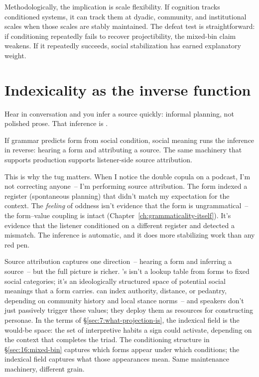 Methodologically, the implication is scale flexibility. If cognition tracks conditioned systems, it can track them at dyadic, community, and institutional scales when those scales are stably maintained. The defeat test is straightforward: if conditioning repeatedly fails to recover projectibility, the mixed-bin claim weakens. If it repeatedly succeeds, social stabilization has earned explanatory weight.

\section{Indexicality as the inverse function}
\label{sec:16:indexicality}

Hear  in conversation and you infer a source quickly: informal planning, not polished prose. That inference is .

If grammar predicts form from social condition, social meaning runs the inference in reverse: hearing a form and attributing a source. The same machinery that supports production supports listener-side source attribution.

This is why the tug matters. When I notice the double copula on a podcast, I'm not correcting anyone~-- I'm performing source attribution. The form indexed a register (spontaneous planning) that didn't match my expectation for the context. The \emph{feeling} of oddness isn't evidence that the form is ungrammatical~-- the form--value coupling is intact (Chapter~\ref{ch:grammaticality-itself}). It's evidence that the listener conditioned on a different register and detected a mismatch. The inference is automatic, and it does more stabilizing work than any red pen.

Source attribution captures one direction~-- hearing a form and inferring a source~-- but the full picture is richer. \textcite{eckert2008indexical}'s  isn't a lookup table from forms to fixed social categories; it's an ideologically structured space of potential social meanings that a form carries.  can index authority, distance, or pedantry, depending on community history and local stance norms~-- and speakers don't just passively trigger these values; they deploy them as resources for constructing personae. In the terms of §\ref{sec:7:what-projection-is}, the indexical field is the would-be space: the set of interpretive habits a sign could activate, depending on the context that completes the triad. The conditioning structure in §\ref{sec:16:mixed-bin} captures which forms appear under which conditions; the indexical field captures what those appearances mean. Same maintenance machinery, different grain.

